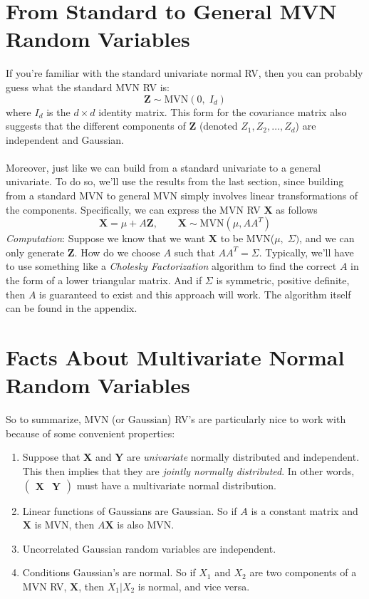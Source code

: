 \documentclass[a4paper,12pt]{scrartcl}
\begin{document}
\newpage
\section{From Standard to General MVN Random Variables}

If you're familiar with the standard univariate normal RV,
then you can probably guess what the standard MVN RV is:
\begin{equation}
    \mathbf{Z} \sim \text{MVN}(0, \; I_d) 
\end{equation}
where $I_d$ is the $d\times d$ identity matrix.  This form for
the covariance matrix also suggests that the different components
of $\mathbf{Z}$ (denoted $Z_1, Z_2, \ldots, Z_d$) are independent and
Gaussian.
\\
\\
Moreover, just like we can build from a standard univariate to
a general univariate.  To do so, we'll use the results from the 
last section, since building from a standard MVN
to general MVN simply involves linear transformations of the components.
Specifically, we can express the MVN RV $\mathbf{X}$ as follows
\begin{equation}
    \mathbf{X} = \mu + A\mathbf{Z}, \qquad \mathbf{X}\sim 
	\text{MVN}(\mu, AA^T)
\end{equation}
{\sl Computation}: Suppose we know that we want $\mathbf{X}$ to
be MVN($\mu, \; \Sigma)$, and we can only generate $\mathbf{Z}$.
How do we choose $A$ such that $AA^T = \Sigma$.  Typically, we'll
have to use something like a \emph{Cholesky Factorization}
algorithm to find the correct $A$ in the form of a lower triangular
matrix. And if $\Sigma$ is symmetric, positive definite, then 
$A$ is guaranteed to exist and this approach will work. 
The algorithm itself can be found in the appendix.


\section{Facts About Multivariate Normal Random Variables}

So to summarize, MVN (or Gaussian) RV's are particularly nice to work with because
of some convenient properties:
\begin{enumerate}
    \item Suppose that $\mathbf{X}$ and $\mathbf{Y}$ are \emph{univariate}
	normally distributed and independent. This then implies that they are 
	\emph{jointly normally distributed}. In other words, 
	$\begin{pmatrix} \mathbf{X} & \mathbf{Y} \end{pmatrix}$ must have a multivariate
	normal distribution. 
    \item Linear functions of Gaussians are Gaussian. So if $A$
	is a constant matrix and $\mathbf{X}$ is MVN, then $A\mathbf{X}$
	is also MVN.
    \item Uncorrelated Gaussian random variables are independent.
    \item Conditions Gaussian's are normal. So if $X_1$ and $X_2$
	are two components of a MVN RV, $\mathbf{X}$, then 
	$X_1 | X_2$ is normal, and vice versa.
\end{enumerate}
\end{document}
